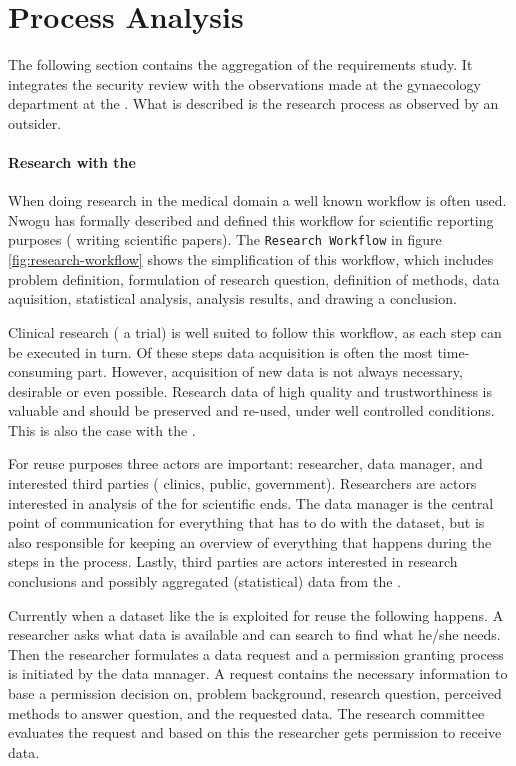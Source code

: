 \section{Process Analysis}
\label{process-analysis}

The following section contains the aggregation of the requirements study.
It integrates the security review with the observations made at the gynaecology department at the \AMC{}.
What is described is the research process as observed by an outsider.

\paragraph{Research with the \projectdata{}}

When doing research in the medical domain a well known workflow is often used. Nwogu \cite{nwogu} has formally described and defined this workflow for scientific reporting purposes (\ie{} writing scientific papers).
The {\tt Research Workflow} in figure \ref{fig:research-workflow} shows the simplification of this workflow, which includes problem definition, formulation of research question, definition of methods, data aquisition, statistical analysis, analysis results, and drawing a conclusion.

Clinical research (\eg{} a trial) is well suited to follow this workflow, as each step can be executed in turn.
Of these steps data acquisition is often the most time-consuming part.
However, acquisition of new data is not always necessary,  desirable or even possible. 
Research data of high quality and trustworthiness is valuable and should be preserved and re-used, under well controlled conditions. 
This is also the case with the \projectdata{}.

For reuse purposes three actors are important: researcher, data manager, and interested third parties (\eg{} clinics, public, government).
Researchers are actors interested in analysis of the \projectdata{} for scientific ends.
The data manager is the central point of communication for everything that has to do with the dataset, but is also responsible for keeping an overview of everything that happens during the steps in the process.
Lastly, third parties are actors interested in research conclusions and possibly aggregated (statistical) data from the \projectdata{}.

Currently when a dataset like the \projectdata{} is exploited for reuse the following happens.
A researcher asks what data is available and can search to find what he/she needs.
Then the researcher formulates a data request and a permission granting process is initiated by the data manager.
A request contains the necessary information to base a permission decision on, \eg{} problem background, research question, perceived methods to answer question, and the requested data.
The research committee evaluates the request and based on this the researcher gets permission to receive data.

